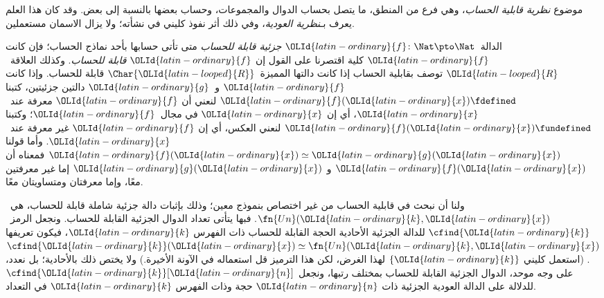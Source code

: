 \documentclass[../../../include/open-logic-section]{subfiles}
\begin{document}

موضوع \emph{نظرية قابلية الحساب}، وهي فرع من المنطق، ما يتصل
بحساب الدوال والمجموعات، وحساب بعضها بالنسبة إلى بعض. وقد كان
هذا العلم يعرف بـ\emph{نظرية العودية}، وفي ذلك أثر نفوذ كليني في نشأته؛
ولا يزال الاسمان مستعملين.

الدالة~${\OLId{latin-ordinary}{f}}\colon\Nat\pto\Nat$ \emph{جزئية قابلة للحساب} متى تأتى
حسابها بأحد نماذج الحساب؛ فإن كانت ${\OLId{latin-ordinary}{f}}$ كلية اقتصرنا على القول إن
${\OLId{latin-ordinary}{f}}$ \emph{قابلة للحساب}. وكذلك العلاقة~${\OLId{latin-looped}{R}}$ توصف بقابلية الحساب إذا كانت دالتها
المميزة~$\Char{{\OLId{latin-looped}{R}}}$ قابلة للحساب. وإذا كانت ${\OLId{latin-ordinary}{f}}$ و~${\OLId{latin-ordinary}{g}}$ دالتين
جزئيتين، كتبنا ${\OLId{latin-ordinary}{f}}({\OLId{latin-ordinary}{x}})\fdefined$ لنعني أن ${\OLId{latin-ordinary}{f}}$ معرفة عند~${\OLId{latin-ordinary}{x}}$، أي إن
${\OLId{latin-ordinary}{x}}$ في مجال~${\OLId{latin-ordinary}{f}}$؛ وكتبنا ${\OLId{latin-ordinary}{f}}({\OLId{latin-ordinary}{x}})\fundefined$ لنعني العكس، أي إن ${\OLId{latin-ordinary}{f}}$
غير معرفة عند~${\OLId{latin-ordinary}{x}}$. وأما قولنا ${\OLId{latin-ordinary}{f}}({\OLId{latin-ordinary}{x}})\simeq {\OLId{latin-ordinary}{g}}({\OLId{latin-ordinary}{x}})$ فمعناه أن ${\OLId{latin-ordinary}{f}}({\OLId{latin-ordinary}{x}})$ و
${\OLId{latin-ordinary}{g}}({\OLId{latin-ordinary}{x}})$ إما غير معرفتين معًا، وإما معرفتان ومتساويتان معًا.

ولنا أن نبحث في قابلية الحساب من غير اختصاص بنموذج
معين؛ وذلك بإثبات دالة جزئية شاملة قابلة للحساب،
هي~$\fn{Un}({\OLId{latin-ordinary}{k}},{\OLId{latin-ordinary}{x}})$. فبها يتأتى تعداد الدوال الجزئية القابلة للحساب.
ونجعل الرمز~$\cfind{{\OLId{latin-ordinary}{k}}}$ للدالة الجزئية الأحادية الحجة
القابلة للحساب ذات الفهرس ${\OLId{latin-ordinary}{k}}$، فيكون تعريفها
$\cfind{{\OLId{latin-ordinary}{k}}}({\OLId{latin-ordinary}{x}})\simeq\fn{Un}({\OLId{latin-ordinary}{k}},{\OLId{latin-ordinary}{x}})$. (استعمل كليني $\{{\OLId{latin-ordinary}{k}}\}$ لهذا الغرض،
لكن هذا الترميز قل استعماله في الآونة الأخيرة.) ولا يختص ذلك بالأحادية؛
بل نعدد، على وجه موحد، الدوال الجزئية القابلة للحساب بمختلف
رتبها، ونجعل $\cfind{{\OLId{latin-ordinary}{k}}}[{\OLId{latin-ordinary}{n}}]$ للدلالة على الدالة العودية الجزئية
ذات ${\OLId{latin-ordinary}{n}}$ حجة وذات الفهرس ${\OLId{latin-ordinary}{k}}$ في التعداد.
\end{document}
